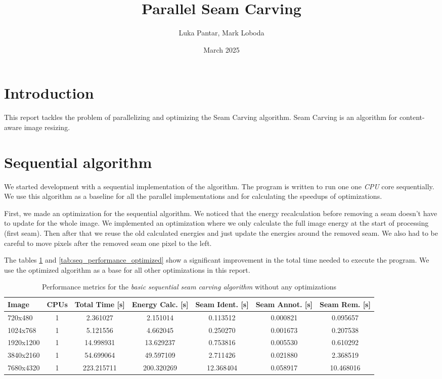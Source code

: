 \documentclass{article}
\title{Parallel Seam Carving}
\author{Luka Pantar, Mark Loboda}
\date{March 2025}
\begin{document}
\maketitle

\section{Introduction}
This report tackles the problem of parallelizing and optimizing the Seam Carving algorithm. Seam Carving is an algorithm for content-aware image resizing.

\section{Sequential algorithm}
We started development with a sequential implementation of the algorithm. The program is written to run one one \textit{CPU} core sequentially. We use this algorithm as a baseline for all the parallel implementations and for calculating the speedups of optimizations.

First, we made an optimization for the sequential algorithm. We noticed that the energy recalculation before removing a seam doesn't have to update for the whole image. We implemented an optimization where we only calculate the full image energy at the start of processing (first seam). Then after that we reuse the old calculated energies and just update the energies around the removed seam. We also had to be careful to move pixels after the removed seam one pixel to the left.

The tables \ref{tab:seq_performance} and \ref{tab:seq_performance_optimized} show a significant improvement in the total time needed to execute the program. We use the optimized algorithm as a base for all other optimizations in this report.

\begin{table}[H]
    \centering
    \scriptsize
    \begin{tabular}{lcccccc}
        \toprule
        Image & CPUs & Total Time [s] & Energy Calc. [s] & Seam Ident. [s] & Seam Annot. [s] & Seam Rem. [s] \\
        \midrule
        720x480 & 1 & 2.361027 & 2.151014 & 0.113512 & 0.000821 & 0.095657 \\
        1024x768 & 1 & 5.121556 & 4.662045 & 0.250270 & 0.001673 & 0.207538 \\
        1920x1200 & 1 & 14.998931 & 13.629237 & 0.753816 & 0.005530 & 0.610292 \\
        3840x2160 & 1 & 54.699064 & 49.597109 & 2.711426 & 0.021880 & 2.368519 \\
        7680x4320 & 1 & 223.215711 & 200.320269 & 12.368404 & 0.058917 & 10.468016 \\
        \bottomrule
    \end{tabular}
    \caption{Performance metrics for the \textit{basic sequential seam carving algorithm} without any optimizations}
    \label{tab:seq_performance}
\end{table}
\end{document}
